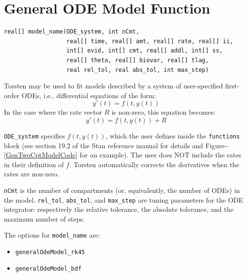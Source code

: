 \documentclass[11pt, reqno]{amsbook}
\numberwithin{section}{chapter}
\theoremstyle{remark}
\begin{document}
\section{General ODE Model Function}
\label{sec:orgeb652d6}
\begin{verbatim}
real[] model_name(ODE_system, int nCmt,
                  real[] time, real[] amt, real[] rate, real[] ii,
                  int[] evid, int[] cmt, real[] addl, int[] ss,
                  real[] theta, real[] biovar, real[] tlag,                      
                  real rel_tol, real abs_tol, int max_step)
\end{verbatim}

Torsten may be used to fit models described by a system of
user-specified first-order ODEs, i.e., differential equations of the form:
\begin{equation*}
y'(t) = f(t, y(t))
\end{equation*}
In the case where the rate vector \(R\) is non-zero, this equation becomes:
\begin{equation*}
y'(t) = f(t, y(t)) + R
\end{equation*}

\texttt{ODE\_system} specifies \(f(t, y(t))\), which the user
defines inside the \texttt{functions} block (see section 19.2 of the
Stan reference manual for details and Figure\textasciitilde{}\ref{GenTwoCptModelCode}
for an example). The user does NOT include the rates in their
definition of \(f\). Torsten automatically corrects the derivatives when
the rates are non-zero.

\texttt{nCmt} is the number of compartments (or, equivalently, the
number of ODEs) in the model. \texttt{rel\_tol}, \texttt{abs\_tol},
and \texttt{max\_step} are tuning parameters for the ODE integrator:
respectively the relative tolerance, the absolute tolerance, and the
maximum number of steps.

The options for \texttt{model\_name} are:
\begin{itemize}
\item \texttt{generalOdeModel\_rk45}
\item \texttt{generalOdeModel\_bdf}
\end{itemize}
\end{document}
